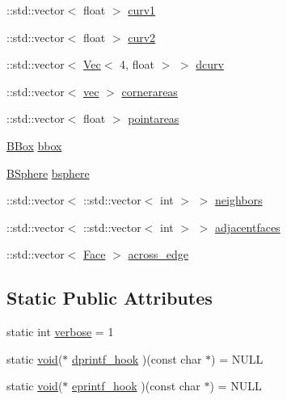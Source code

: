 \begin{DoxyCompactItemize}
\+::std\+::vector$<$ float $>$ \hyperlink{classtrimesh_1_1TriMesh_a7327e090de6f6171fd662b48c08a33b1}{curv1}
\item 
\+::std\+::vector$<$ float $>$ \hyperlink{classtrimesh_1_1TriMesh_afbeb68c068830359351e0f30a05eab7e}{curv2}
\item 
\+::std\+::vector$<$ \hyperlink{classtrimesh_1_1Vec}{Vec}$<$ 4, float $>$ $>$ \hyperlink{classtrimesh_1_1TriMesh_a120989b0b99ce133572bb32cd41befa6}{dcurv}
\item 
\+::std\+::vector$<$ \hyperlink{namespacetrimesh_a4fc2b83feba99c931f837a0c7d4b4df1}{vec} $>$ \hyperlink{classtrimesh_1_1TriMesh_a1c9eaa0f6a4e98c7c9fe2a4cd81f319b}{cornerareas}
\item 
\+::std\+::vector$<$ float $>$ \hyperlink{classtrimesh_1_1TriMesh_a5ed922bd99d163265811f6f0ed518995}{pointareas}
\item 
\hyperlink{classtrimesh_1_1TriMesh_a32708e131e1ccac6238a226edf5a43f6}{B\+Box} \hyperlink{classtrimesh_1_1TriMesh_a82dbf26f7a507b0a5c0f896c60b7c086}{bbox}
\item 
\hyperlink{structtrimesh_1_1TriMesh_1_1BSphere}{B\+Sphere} \hyperlink{classtrimesh_1_1TriMesh_a199622d8202df23bab4fb97c78e12587}{bsphere}
\item 
\+::std\+::vector$<$ \+::std\+::vector$<$ int $>$ $>$ \hyperlink{classtrimesh_1_1TriMesh_a083998f6cb007ea8a98a51a32732c894}{neighbors}
\item 
\+::std\+::vector$<$ \+::std\+::vector$<$ int $>$ $>$ \hyperlink{classtrimesh_1_1TriMesh_a6411fb17ca70e0ecfa8c936c9ae9427c}{adjacentfaces}
\item 
\+::std\+::vector$<$ \hyperlink{classtrimesh_1_1TriMesh_a06cb64bb6435d5cf4d7b24d2950fe8e7}{Face} $>$ \hyperlink{classtrimesh_1_1TriMesh_a06884cdb2753f6aa878c8b0ab21ff27f}{across\+\_\+edge}
\end{DoxyCompactItemize}
\subsection*{Static Public Attributes}
\begin{DoxyCompactItemize}
\item 
static int \hyperlink{classtrimesh_1_1TriMesh_ae3a58949e68e935230335e03586151b4}{verbose} = 1
\item 
static \hyperlink{namespacetrimesh_a784ddfd979e1c579bda795a8edfc3f43}{void}($\ast$ \hyperlink{classtrimesh_1_1TriMesh_a7de8698f56f0e229a90930e62a037c9d}{dprintf\+\_\+hook} )(const char $\ast$) = N\+U\+LL
\item 
static \hyperlink{namespacetrimesh_a784ddfd979e1c579bda795a8edfc3f43}{void}($\ast$ \hyperlink{classtrimesh_1_1TriMesh_a48ab1e07821b9113c04326868fa4a41b}{eprintf\+\_\+hook} )(const char $\ast$) = N\+U\+LL
\end{DoxyCompactItemize}
